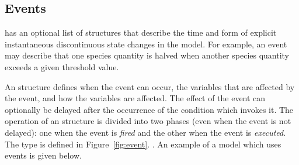 \subsection{Events}
\label{sec:events}

\Model has an optional list of \Event structures that describe the
time and form of explicit instantaneous discontinuous state
changes in the model.  For example, an event may describe that one
species quantity is halved when another species quantity exceeds a
given threshold value.

An \Event structure defines when the event can occur, the
variables that are affected by the event, and how the variables
are affected.  The effect of the event can optionally be delayed
after the occurrence of the condition which invokes it.  The
operation of an \Event structure is divided into two phases (even
when the event is not delayed): one when the event is \emph{fired}
and the other when the event is \emph{executed}. The \Event type
is defined in Figure~\vref{fig:event}.  .  An example
of a model which uses events is given below.

